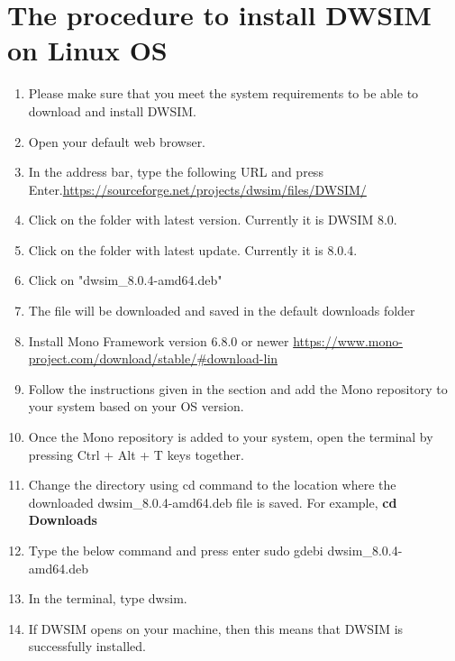 \documentclass[a4paper,12pt]{article}
\begin{document}
\section{The procedure to install DWSIM on Linux OS}

\begin{enumerate}
\item Please make sure that you meet the system requirements to be able to download and install DWSIM.
\item Open your default web browser.
\item In the address bar, type the following URL and press Enter.\newline \url{https://sourceforge.net/projects/dwsim/files/DWSIM/}

\item Click on the folder with latest version. Currently it is DWSIM 8.0.

\item Click on the folder with latest update. Currently it is 8.0.4.
\item Click on "dwsim\_8.0.4-amd64.deb"
\item The file will be downloaded and saved in the default downloads folder
\item Install Mono Framework version 6.8.0 or newer
\newline \url{https://www.mono-project.com/download/stable/#download-lin}
\item Follow the instructions given in the section and add the Mono repository to your system based on your OS version. 
\item Once the Mono repository is added to your system, open the terminal by pressing Ctrl + Alt + T keys together.
\item Change the directory using cd command to the location where the downloaded dwsim\_8.0.4-amd64.deb file is saved. For example, \textbf{cd Downloads}
\item Type the below command and press enter
\newline sudo gdebi dwsim\_8.0.4-amd64.deb
\item In the terminal, type dwsim.
\item If DWSIM opens on your machine, then this means that DWSIM is successfully installed.

\end{enumerate}
\end{document}
